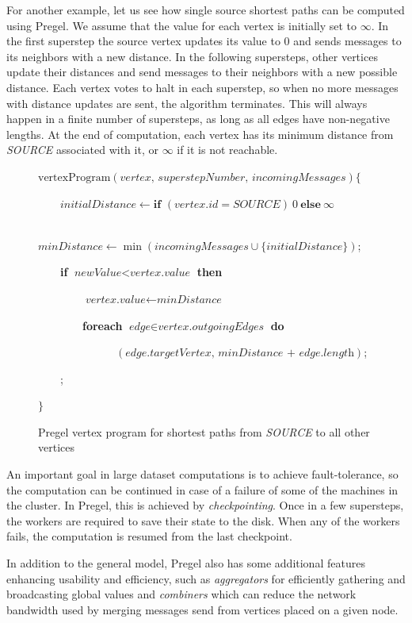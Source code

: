 For another example, let us see how single source shortest paths can be computed using Pregel. 
We assume that the value for each vertex is initially set to $\infty$.
In the first superstep the source vertex updates its value to $0$ and sends messages to its neighbors with a new distance. In the following supersteps,
other vertices update their distances and send messages to their neighbors with a new possible distance. Each vertex votes to halt in each superstep, so when no more messages with distance updates are sent, the algorithm terminates. This will always happen in a finite number of supersteps, as long as all edges have non-negative lengths. At the end of computation, each vertex has its minimum distance from \textit{SOURCE} associated with it, or $\infty$ if it is not reachable.

\begin{figure}[h!]
\parbox{0.8\textwidth}{
$\text{vertexProgram}(\textit{vertex, superstepNumber, incomingMessages}) \{$

~~~~$\textit{initialDistance} \leftarrow \textbf{if }(vertex.id = SOURCE)~0~\textbf{else}~\infty$

~~~~$\textit{minDistance} \leftarrow \min(\textit{incomingMessages} \cup \{\textit{initialDistance}\})$;

~~~~\textbf{if} $\textit{newValue} < \textit{vertex.value}$ \textbf{then}

~~~~~~~~$\textit{vertex.value} \leftarrow \textit{minDistance}$

~~~~~~~~\textbf{foreach} $\textit{edge} \in \textit{vertex.outgoingEdges}$ \textbf{do}

~~~~~~~~~~~~~~$(\textit{edge.targetVertex, minDistance + edge.length})$;

~~~~;

$\}$
}

\caption{Pregel vertex program for shortest paths from \textit{SOURCE} to all other vertices}
\end{figure}


An important goal in large dataset computations is to achieve fault-tolerance, so the computation can be continued in case of a failure of some of the machines in the cluster. In Pregel, this is achieved by \emph{checkpointing}. Once in a few supersteps, the workers are required to save their state to the disk. When any of the workers fails, the computation is resumed from the last checkpoint.

In addition to the general model, Pregel also has some additional features enhancing usability and efficiency, such as \emph{aggregators} for efficiently gathering and broadcasting global values and \emph{combiners} which can reduce the network bandwidth used by merging messages send from vertices placed on a given node.

